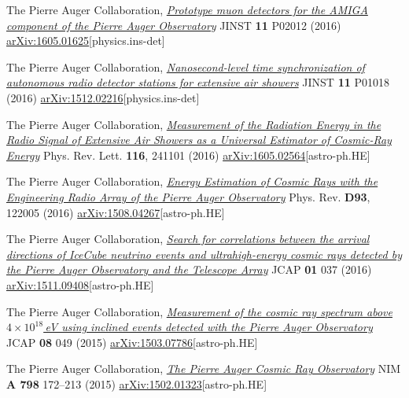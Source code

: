 \begin{etaremune}
\item {}The Pierre Auger Collaboration, \href{http://iopscience.iop.org/article/10.1088/1748-0221/11/02/P02012}{\emph{Prototype muon detectors for the AMIGA component of the Pierre Auger Observatory}} JINST {\bf 11} P02012 (2016) \href{http://arxiv.org/abs/1605.01625}{arXiv:1605.01625}[physics.ins-det]

\item {}The Pierre Auger Collaboration, \href{http://iopscience.iop.org/article/10.1088/1748-0221/11/01/P01018}{\emph{Nanosecond-level time synchronization of autonomous radio detector stations for extensive air showers}} JINST {\bf 11} P01018 (2016) \href{http://arxiv.org/abs/1512.02216}{arXiv:1512.02216}[physics.ins-det]

\item {}The Pierre Auger Collaboration, \href{http://journals.aps.org/prl/abstract/10.1103/PhysRevLett.116.241101}{\emph{Measurement of the Radiation Energy in the Radio Signal of Extensive Air Showers as a Universal Estimator of Cosmic-Ray Energy}} Phys. Rev. Lett. {\bf 116}, 241101 (2016) \href{http://arxiv.org/abs/1605.02564}{arXiv:1605.02564}[astro-ph.HE]

\item {}The Pierre Auger Collaboration, \href{http://journals.aps.org/prd/abstract/10.1103/PhysRevD.93.122005}{\emph{Energy Estimation of Cosmic Rays with the Engineering Radio Array of the Pierre Auger Observatory}} Phys. Rev. {\bf D93}, 122005 (2016) \href{http://arxiv.org/abs/1508.04267}{arXiv:1508.04267}[astro-ph.HE]

\item {}The Pierre Auger Collaboration, \href{http://dx.doi.org/10.1088/1475-7516/2016/01/037}{\emph{Search for correlations between the arrival directions of IceCube neutrino events and ultrahigh-energy cosmic rays detected by the Pierre Auger Observatory and the Telescope Array}} JCAP {\bf{01}} 037 (2016) \href{http://arxiv.org/abs/1511.09408}{arXiv:1511.09408}[astro-ph.HE]

\item {}The Pierre Auger Collaboration, \href{http://dx.doi.org/10.1088/1475-7516/2015/08/049}{\emph{Measurement of the cosmic ray spectrum above $4\times 10^{18}$\,eV using inclined events detected with the Pierre Auger Observatory}} JCAP {\bf{08}} 049 (2015) \href{http://arxiv.org/abs/1503.07786}{arXiv:1503.07786}[astro-ph.HE]

\item {}The Pierre Auger Collaboration, \href{http://dx.doi.org/10.1016/j.nima.2015.06.058}{\emph{The Pierre Auger Cosmic Ray Observatory}} NIM {\bf{A 798}} 172--213 (2015) \href{http://arxiv.org/abs/1502.01323}{arXiv:1502.01323}[astro-ph.HE]


\end{etaremune}

